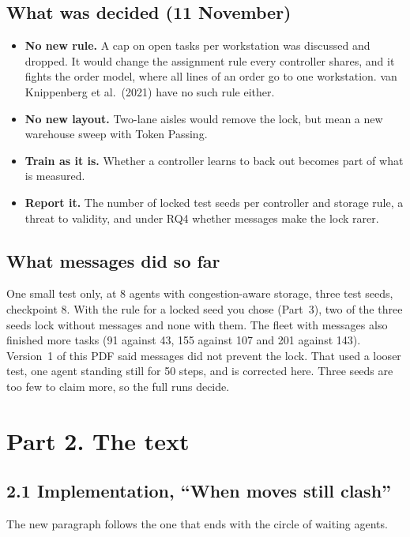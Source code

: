 \documentclass[11pt,a4paper]{article}
\begin{document}
\subsection*{What was decided (11 November)}
\begin{itemize}[leftmargin=1.2em]
\item \textbf{No new rule.} A cap on open tasks per workstation was
discussed and dropped. It would change the assignment rule every controller
shares, and it fights the order model, where all lines of an order go to one
workstation. van Knippenberg et al.\ (2021) have no such rule either.
\item \textbf{No new layout.} Two-lane aisles would remove the lock, but
mean a new warehouse sweep with Token Passing.
\item \textbf{Train as it is.} Whether a controller learns to back out
becomes part of what is measured.
\item \textbf{Report it.} The number of locked test seeds per controller and
storage rule, a threat to validity, and under RQ4 whether messages make the
lock rarer.
\end{itemize}

\subsection*{What messages did so far}
One small test only, at 8 agents with congestion-aware storage, three test
seeds, checkpoint 8. With the rule for a locked seed you chose (Part~3), two
of the three seeds lock without messages and none with them. The fleet with
messages also finished more tasks (91 against 43, 155 against 107 and 201
against 143). Version~1 of this PDF said messages did not prevent the lock.
That used a looser test, one agent standing still for 50 steps, and is
corrected here. Three seeds are too few to claim more, so the full runs
decide.

\section*{Part 2. The text}

\subsection*{2.1 Implementation, ``When moves still clash''}
The new paragraph follows the one that ends with the circle of waiting
agents.
\end{document}
